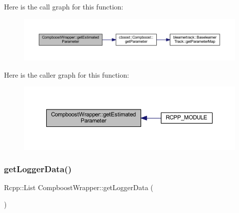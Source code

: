 Here is the call graph for this function\+:\nopagebreak
\begin{figure}[H]
\begin{center}
\leavevmode
\includegraphics[width=350pt]{class_compboost_wrapper_ad31a5a5e70ceee981a14834a8fd52a68_cgraph}
\end{center}
\end{figure}
Here is the caller graph for this function\+:\nopagebreak
\begin{figure}[H]
\begin{center}
\leavevmode
\includegraphics[width=350pt]{class_compboost_wrapper_ad31a5a5e70ceee981a14834a8fd52a68_icgraph}
\end{center}
\end{figure}
\mbox{\label{class_compboost_wrapper_a3175f9dd0d66d042eb5bb9cab859e086}} 
\subsubsection{\texorpdfstring{get\+Logger\+Data()}{getLoggerData()}}
{\footnotesize\ttfamily Rcpp\+::\+List Compboost\+Wrapper\+::get\+Logger\+Data (\begin{DoxyParamCaption}{ }\end{DoxyParamCaption})\hspace{0.3cm}{\ttfamily [inline]}}

